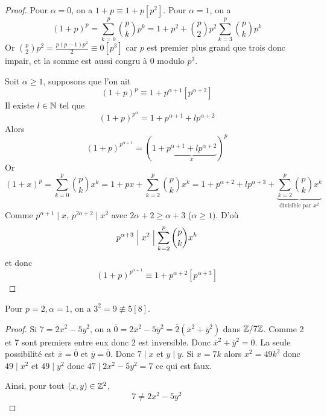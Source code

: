 \documentclass[12pt]{article}
\begin{document}
\begin{proof}
	Pour $\alpha=0$, on a $1+p\equiv 1+p[p^{2}]$. Pour $\alpha=1$, on a 
	\begin{equation}
		(1+p)^{p}=\sum_{k=0}^{p}\binom{p}{k}p^{k}=1+p^{2}+\binom{p}{2}p^{2}\sum_{k=3}^{p}\binom{p}{k}p^{k}
	\end{equation}
	Or $\binom{p}{2}p^{2}=\frac{p(p-1)p^{2}}{2}\equiv0[p^{3}]$ car $p$ est premier plus grand que trois donc impair, et la somme est aussi congru à 0 modulo $p^{3}$.

	Soit $\alpha\geqslant1$, supposons que l'on ait 
	\begin{equation}
		(1+p)^{p}\equiv 1+p^{\alpha+1}[p^{\alpha+2}]
	\end{equation}
	Il existe $l\in\mathbb{N}$ tel que 
	\begin{equation}
		(1+p)^{p^{\alpha}}=1+p^{\alpha+1}+lp^{\alpha+2}
	\end{equation}
	Alors 
	\begin{equation}
		(1+p)^{p^{\alpha+1}}=(1+\underbrace{p^{\alpha+1}+lp^{\alpha+2}}_{x})^{p}
	\end{equation}
	Or
	\begin{equation}
		(1+x)^{p}=\sum_{k=0}^{p}\binom{p}{k}x^{k}=1+px+\sum_{k=2}^{p}\binom{p}{k}x^{k}=1+p^{\alpha+2}+lp^{\alpha+3}+\underbrace{\sum_{k=2}^{p}\binom{p}{k}x^{k}}_{\text{divisible par }x^{2}}
	\end{equation}
	Comme $p^{\alpha+1}\mid x$, $p^{2\alpha+2}\mid x^{2}$ avec $2\alpha+2\geqslant\alpha+3$ ($\alpha\geqslant1)$. D'où 
	\begin{equation}
		p^{\alpha+3}\Bigm| x^{2}\Bigm|\sum_{k=2}^{p}\binom{p}{k}x^{k}
	\end{equation}
	et donc
	\begin{equation}
		\boxed{(1+p)^{p^{\alpha+1}}\equiv1+p^{\alpha+2}[p^{\alpha+3}]}
	\end{equation}
\end{proof}

\begin{remark}
	Pour $p=2,\alpha=1$, on a $3^{2}=9\not\equiv 5[8]$.
\end{remark}

\begin{proof}
	Si $7=2x^{2}-5y^{2}$, on a $\overline{0}=2\overline{x}^{2}-5\overline{y}^{2}=\overline{2}(\overline{x}^{2}+\overline{y}^{2})$ dans $\mathbb{Z}/7\mathbb{Z}$. Comme 2 et 7 sont premiers entre eux donc $\overline{2}$ est inversible. Donc $\overline{x}^{2}+\overline{y}^{2}=\overline{0}$. La seule possibilité est $\overline{x}=\overline{0}$ et $\overline{y}=\overline{0}$. Donc $7\mid x$ et $y\mid y$. Si $x=7k$ alors $x^{2}=49k^{2}$ donc $49\mid x^{2}$ et $49\mid y^{2}$ donc $47\mid 2x^{2}-5y^{2}=7$ ce qui est faux. 

	Ainsi, pour tout $(x,y)\in\mathbb{Z}^{2}$,
	\begin{equation}
		\boxed{7\neq2x^{2}-5y^{2}}
	\end{equation}
\end{proof}
\end{document}
